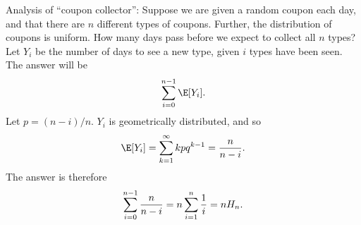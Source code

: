 Analysis of ``coupon collector'':
Suppose we are given a random coupon each day,
and that there are $n$ different types of coupons.
Further,
the distribution of coupons is uniform.
How many days pass before we expect to collect all $n$ types?
Let $Y_i$ be the number of days to see a new type,
given $i$ types have been seen.
The answer will be $$\sum_{i=0}^{n-1} \E[Y_i].$$
Let $p = (n-i)/n$.
$Y_i$ is geometrically distributed,
and so
$$ \E[Y_i] = \sum^\infty_{k=1} kpq^{k-1} = {n \over n-i}.$$
The answer is therefore
$$ \sum_{i=0}^{n-1} {n \over n-i} = n \sum_{i=1}^{n} {1 \over i} = n H_n.$$
